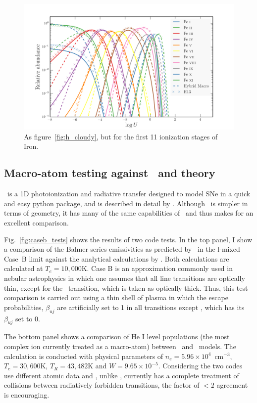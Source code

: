 \begin{figure}
\centering
\includegraphics[width=1.0\textwidth]{figures/03-radtrans/ir_comp.png}
\caption
{
As figure~\ref{fig:h_cloudy}, but for the first 11 ionization stages of Iron.
}
\label{fig:ir_cloudy}
\end{figure}

\subsection{Macro-atom testing against \tar\ and theory}

\tar\ is a 1D photoionization and radiative transfer designed to
model SNe in a quick and easy python package, and is described in detail by
\cite{kerzendorfsim}. Although \tar\ is simpler in terms
of geometry, it has many of the same capabilities of \py\ and 
thus makes for an excellent comparison. 

Fig.~\ref{fig:caseb_tests} shows the results of two code tests. 
In the top panel, I show a comparison of the Balmer series 
emissivities as predicted by \py\ in the l-mixed Case~B limit against the
analytical calculations by \cite{seaton1959}. 
Both calculations are calculated at $T_e=10,000$K.
Case B is an approximation commonly used in nebular astrophysics 
\citep[see e.g.][]{osterbrock} in which
one assumes that all line transitions are optically thin, except
for the \la\ transition, which is taken as optically thick.
Thus, this test comparison is carried out using a thin shell
of plasma in which the escape probabilities, $\beta_{uj}$ 
are artificially set to 1 in all transitions except \la, which
has its $\beta_{uj}$ set to 0.

The bottom panel shows a comparison of He I level populations 
(the most complex ion currently 
treated as a macro-atom) between \py\ and \tar\ models.
The calculation is conducted with physical parameters of $n_e=5.96\times10^4$~cm$^{-3}$,
$T_e=30,600$K, $T_R=43,482$K and $W=9.65\times10^{-5}$. 
Considering the two codes use different atomic data and 
\tar, unlike \py, currently has a 
complete treatment of collisions between 
radiatively forbidden transitions, the factor of 
$<2$ agreement is encouraging. 

